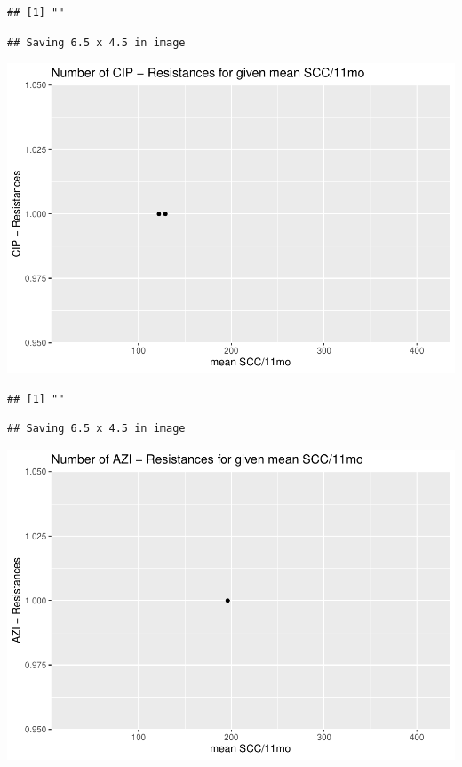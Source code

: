 \documentclass[
]{article}
\begin{document}
\begin{verbatim}
## [1] ""
\end{verbatim}

\begin{verbatim}
## Saving 6.5 x 4.5 in image
\end{verbatim}

\includegraphics{NResistenzen_files/figure-latex/numerical_variables-12.pdf}

\begin{verbatim}
## [1] ""
\end{verbatim}

\begin{verbatim}
## Saving 6.5 x 4.5 in image
\end{verbatim}

\includegraphics{NResistenzen_files/figure-latex/numerical_variables-13.pdf}
\end{document}
